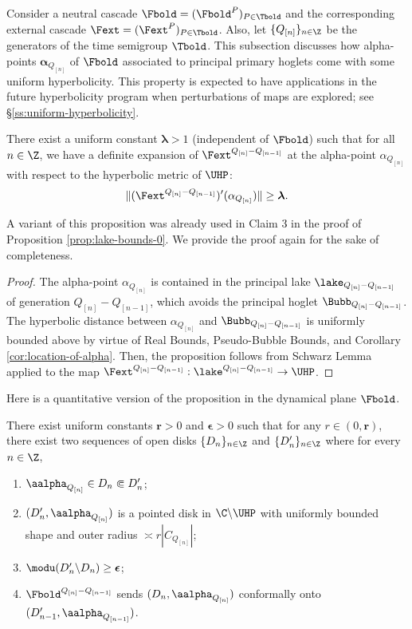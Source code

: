 \documentclass{amsart}
\begin{document}
Consider a neutral cascade $\Fbold = (\Fbold^{P})_{P \in \Tbold}$ and the corresponding external cascade $\Fext = (\Fext^P)_{P \in \Tbold}$. 
Also, let $\{Q_{[n]}\}_{n\in\Z}$ be the generators of the time semigroup $\Tbold$.
This subsection discusses how alpha-points $\boldsymbol{\alpha}_{Q_{[n]}}$ of $\Fbold$ associated to principal primary hoglets come with some uniform hyperbolicity.
This property is expected to have applications in the future hyperbolicity program when perturbations of maps are explored; see \S\ref{ss:uniform-hyperbolicity}.

\begin{proposition}
    There exist a uniform constant $\boldsymbol{\lambda}>1$ (independent of $\Fbold$) such that for all $n \in \Z$, we have a definite expansion of $\Fext^{Q_{[n]}-Q_{[n-1]}}$ at the alpha-point $\alpha_{Q_{[n]}}$ with respect to the hyperbolic metric of $\UHP$:
    \[
        \| (\Fext^{Q_{[n]}-Q_{[n-1]}})'(\alpha_{Q_{[n]}}) \| \geq \boldsymbol{\lambda}.
    \]
\end{proposition}

A variant of this proposition was already used in Claim 3 in the proof of Proposition \ref{prop:lake-bounds-0}.
We provide the proof again for the sake of completeness.

\begin{proof}
    The alpha-point $\alpha_{Q_{[n]}}$ is contained in the principal lake $\lake_{Q_{[n]}-Q_{[n-1]}}$ of generation $Q_{[n]}-Q_{[n-1]}$, which avoids the principal hoglet $\Bubb_{Q_{[n]}-Q_{[n-1]}}$.
    The hyperbolic distance between $\alpha_{Q_{[n]}}$ and $\Bubb_{Q_{[n]}-Q_{[n-1]}}$ is uniformly bounded above by virtue of Real Bounds, Pseudo-Bubble Bounds, and Corollary \ref{cor:location-of-alpha}.
    Then, the proposition follows from Schwarz Lemma applied to the map $\Fext^{Q_{[n]}-Q_{[n-1]}}: \lake^{Q_{[n]}-Q_{[n-1]}} \to \UHP$.
\end{proof}

Here is a quantitative version of the proposition in the dynamical plane $\Fbold$.

\begin{proposition}
    There exist uniform constants $\mathbf{r}>0$ and $\boldsymbol{\epsilon}>0$ such that for any $r \in (0,\mathbf{r})$, there exist two sequences of open disks $\{ D_n \}_{n \in \Z}$ and $\{ D'_n \}_{n \in \Z}$ where for every $n \in \Z$,
    \begin{enumerate}
        \item $\aalpha_{Q_{[n]}} \in D_n \Subset D'_n$;
        \item $(D'_n, \aalpha_{Q_{[n]}})$ is a pointed disk in $\C \backslash \UHP$ with uniformly bounded shape and outer radius $\asymp r |C_{Q_{[n]}}|$;
        \item $\modu(D'_n \backslash D_n) \geq \boldsymbol{\epsilon}$;
        \item $\Fbold^{Q_{[n]}-Q_{[n-1]}}$ sends $(D_n, \aalpha_{Q_{[n]}})$ conformally onto $(D'_{n-1}, \aalpha_{Q_{[n-1]}})$.
    \end{enumerate}
\end{proposition}
\end{document}
